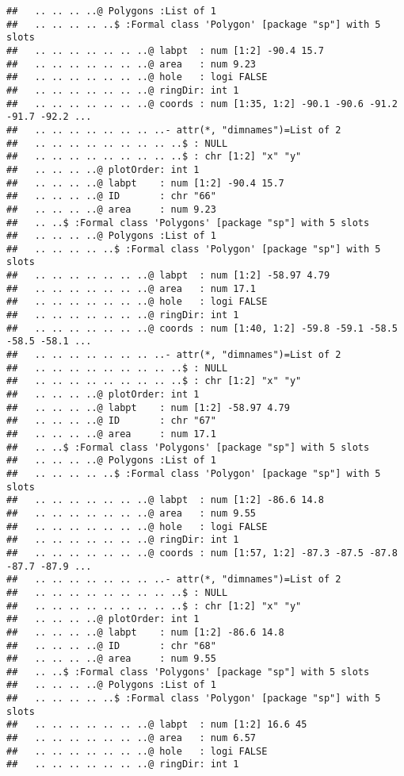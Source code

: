 \documentclass[]{article}
\begin{document}
\begin{verbatim}
##   .. .. .. ..@ Polygons :List of 1
##   .. .. .. .. ..$ :Formal class 'Polygon' [package "sp"] with 5 slots
##   .. .. .. .. .. .. ..@ labpt  : num [1:2] -90.4 15.7
##   .. .. .. .. .. .. ..@ area   : num 9.23
##   .. .. .. .. .. .. ..@ hole   : logi FALSE
##   .. .. .. .. .. .. ..@ ringDir: int 1
##   .. .. .. .. .. .. ..@ coords : num [1:35, 1:2] -90.1 -90.6 -91.2 -91.7 -92.2 ...
##   .. .. .. .. .. .. .. ..- attr(*, "dimnames")=List of 2
##   .. .. .. .. .. .. .. .. ..$ : NULL
##   .. .. .. .. .. .. .. .. ..$ : chr [1:2] "x" "y"
##   .. .. .. ..@ plotOrder: int 1
##   .. .. .. ..@ labpt    : num [1:2] -90.4 15.7
##   .. .. .. ..@ ID       : chr "66"
##   .. .. .. ..@ area     : num 9.23
##   .. ..$ :Formal class 'Polygons' [package "sp"] with 5 slots
##   .. .. .. ..@ Polygons :List of 1
##   .. .. .. .. ..$ :Formal class 'Polygon' [package "sp"] with 5 slots
##   .. .. .. .. .. .. ..@ labpt  : num [1:2] -58.97 4.79
##   .. .. .. .. .. .. ..@ area   : num 17.1
##   .. .. .. .. .. .. ..@ hole   : logi FALSE
##   .. .. .. .. .. .. ..@ ringDir: int 1
##   .. .. .. .. .. .. ..@ coords : num [1:40, 1:2] -59.8 -59.1 -58.5 -58.5 -58.1 ...
##   .. .. .. .. .. .. .. ..- attr(*, "dimnames")=List of 2
##   .. .. .. .. .. .. .. .. ..$ : NULL
##   .. .. .. .. .. .. .. .. ..$ : chr [1:2] "x" "y"
##   .. .. .. ..@ plotOrder: int 1
##   .. .. .. ..@ labpt    : num [1:2] -58.97 4.79
##   .. .. .. ..@ ID       : chr "67"
##   .. .. .. ..@ area     : num 17.1
##   .. ..$ :Formal class 'Polygons' [package "sp"] with 5 slots
##   .. .. .. ..@ Polygons :List of 1
##   .. .. .. .. ..$ :Formal class 'Polygon' [package "sp"] with 5 slots
##   .. .. .. .. .. .. ..@ labpt  : num [1:2] -86.6 14.8
##   .. .. .. .. .. .. ..@ area   : num 9.55
##   .. .. .. .. .. .. ..@ hole   : logi FALSE
##   .. .. .. .. .. .. ..@ ringDir: int 1
##   .. .. .. .. .. .. ..@ coords : num [1:57, 1:2] -87.3 -87.5 -87.8 -87.7 -87.9 ...
##   .. .. .. .. .. .. .. ..- attr(*, "dimnames")=List of 2
##   .. .. .. .. .. .. .. .. ..$ : NULL
##   .. .. .. .. .. .. .. .. ..$ : chr [1:2] "x" "y"
##   .. .. .. ..@ plotOrder: int 1
##   .. .. .. ..@ labpt    : num [1:2] -86.6 14.8
##   .. .. .. ..@ ID       : chr "68"
##   .. .. .. ..@ area     : num 9.55
##   .. ..$ :Formal class 'Polygons' [package "sp"] with 5 slots
##   .. .. .. ..@ Polygons :List of 1
##   .. .. .. .. ..$ :Formal class 'Polygon' [package "sp"] with 5 slots
##   .. .. .. .. .. .. ..@ labpt  : num [1:2] 16.6 45
##   .. .. .. .. .. .. ..@ area   : num 6.57
##   .. .. .. .. .. .. ..@ hole   : logi FALSE
##   .. .. .. .. .. .. ..@ ringDir: int 1

\end{verbatim}
\end{document}
